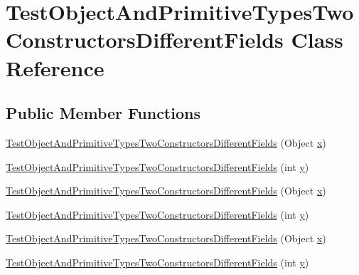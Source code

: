 \hypertarget{classTestObjectAndPrimitiveTypesTwoConstructorsDifferentFields}{
\section{TestObjectAndPrimitiveTypesTwoConstructorsDifferentFields Class Reference}
\label{classTestObjectAndPrimitiveTypesTwoConstructorsDifferentFields}
}
\subsection*{Public Member Functions}
\begin{DoxyCompactItemize}
\item 
\hyperlink{classTestObjectAndPrimitiveTypesTwoConstructorsDifferentFields_a1700da7274a7df883f35c35f048a87dc}{TestObjectAndPrimitiveTypesTwoConstructorsDifferentFields} (Object \hyperlink{classTestObjectAndPrimitiveTypesTwoConstructorsDifferentFields_acd6e4372ac5a3f095fe827a7649f4e01}{x})
\item 
\hyperlink{classTestObjectAndPrimitiveTypesTwoConstructorsDifferentFields_ad67d6484799aed0100b04acafd89fbb4}{TestObjectAndPrimitiveTypesTwoConstructorsDifferentFields} (int \hyperlink{classTestObjectAndPrimitiveTypesTwoConstructorsDifferentFields_a78a43959fdccd99feddcc7042de33188}{y})
\item 
\hyperlink{classTestObjectAndPrimitiveTypesTwoConstructorsDifferentFields_a1700da7274a7df883f35c35f048a87dc}{TestObjectAndPrimitiveTypesTwoConstructorsDifferentFields} (Object \hyperlink{classTestObjectAndPrimitiveTypesTwoConstructorsDifferentFields_acd6e4372ac5a3f095fe827a7649f4e01}{x})
\item 
\hyperlink{classTestObjectAndPrimitiveTypesTwoConstructorsDifferentFields_ad67d6484799aed0100b04acafd89fbb4}{TestObjectAndPrimitiveTypesTwoConstructorsDifferentFields} (int \hyperlink{classTestObjectAndPrimitiveTypesTwoConstructorsDifferentFields_a78a43959fdccd99feddcc7042de33188}{y})
\item 
\hyperlink{classTestObjectAndPrimitiveTypesTwoConstructorsDifferentFields_a1700da7274a7df883f35c35f048a87dc}{TestObjectAndPrimitiveTypesTwoConstructorsDifferentFields} (Object \hyperlink{classTestObjectAndPrimitiveTypesTwoConstructorsDifferentFields_acd6e4372ac5a3f095fe827a7649f4e01}{x})
\item 
\hyperlink{classTestObjectAndPrimitiveTypesTwoConstructorsDifferentFields_ad67d6484799aed0100b04acafd89fbb4}{TestObjectAndPrimitiveTypesTwoConstructorsDifferentFields} (int \hyperlink{classTestObjectAndPrimitiveTypesTwoConstructorsDifferentFields_a78a43959fdccd99feddcc7042de33188}{y})

\end{DoxyCompactItemize}
